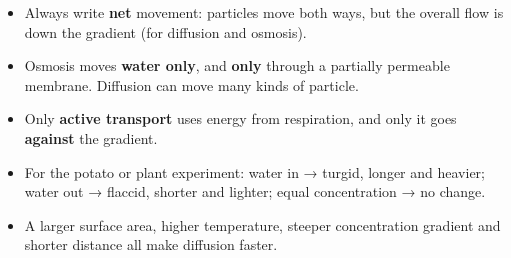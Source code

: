 \documentclass[11pt]{article}
\begin{document}
\begin{itemize}
\item Always write \textbf{net} movement: particles move both ways, but the overall flow is down the gradient (for diffusion and osmosis).

\item Osmosis moves \textbf{water only}, and \textbf{only} through a partially permeable membrane. Diffusion can move many kinds of particle.

\item Only \textbf{active transport} uses energy from respiration, and only it goes \textbf{against} the gradient.

\item For the potato or plant experiment: water in → turgid, longer and heavier; water out → flaccid, shorter and lighter; equal concentration → no change.

\item A larger surface area, higher temperature, steeper concentration gradient and shorter distance all make diffusion faster.

\end{itemize}
\end{document}
